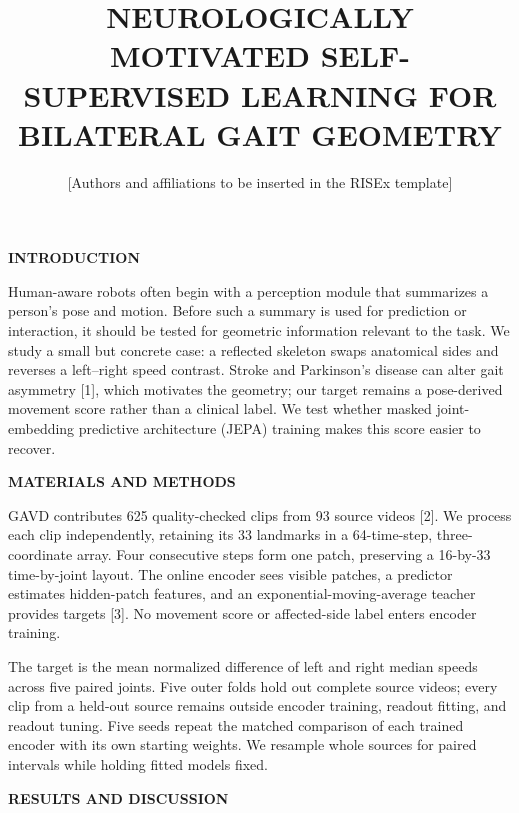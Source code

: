 \documentclass[11pt,letterpaper]{article}
\title{\vspace{-1.2em}\textbf{\MakeUppercase{Neurologically Motivated
Self-Supervised Learning for Bilateral Gait Geometry}}\vspace{-0.5em}}
\author{\normalsize [Authors and affiliations to be inserted in the RISEx template]}
\date{}
\renewcommand{\subsection}[1]{\vspace{2pt}\noindent\textbf{#1}\par\vspace{1pt}}
\begin{document}
\twocolumn[
  \begin{@twocolumnfalse}
  \maketitle
  \vspace{-1.1em}
  \end{@twocolumnfalse}
]
\subsection{INTRODUCTION}\label{introduction}

Human-aware robots often begin with a perception module that summarizes
a person's pose and motion. Before such a summary is used for prediction
or interaction, it should be tested for geometric information relevant
to the task. We study a small but concrete case: a reflected skeleton
swaps anatomical sides and reverses a left--right speed contrast. Stroke
and Parkinson's disease can alter gait asymmetry {[}1{]}, which
motivates the geometry; our target remains a pose-derived movement score
rather than a clinical label. We test whether masked joint-embedding
predictive architecture (JEPA) training makes this score easier to
recover.

\subsection{MATERIALS AND METHODS}\label{materials-and-methods}

GAVD contributes 625 quality-checked clips from 93 source videos
{[}2{]}. We process each clip independently, retaining its 33 landmarks
in a 64-time-step, three-coordinate array. Four consecutive steps form
one patch, preserving a 16-by-33 time-by-joint layout. The online
encoder sees visible patches, a predictor estimates hidden-patch
features, and an exponential-moving-average teacher provides targets
{[}3{]}. No movement score or affected-side label enters encoder
training.

The target is the mean normalized difference of left and right median
speeds across five paired joints. Five outer folds hold out complete
source videos; every clip from a held-out source remains outside encoder
training, readout fitting, and readout tuning. Five seeds repeat the
matched comparison of each trained encoder with its own starting
weights. We resample whole sources for paired intervals while holding
fitted models fixed.

\subsection{RESULTS AND DISCUSSION}\label{results-and-discussion}
\end{document}
